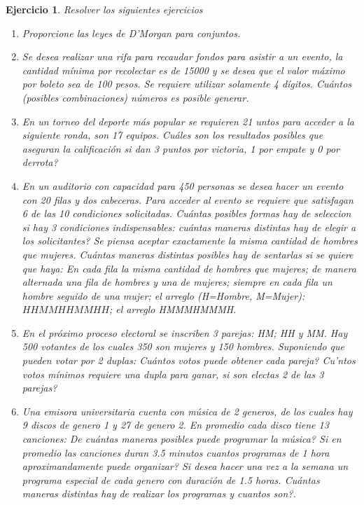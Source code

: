 \documentclass[12pt,twoside]{article}
\newtheorem{Ejer}{Ejercicio}
\begin{document}
\begin{Ejer} Resolver los siguientes ejercicios
\begin{enumerate}

\item Proporcione las leyes de D'Morgan para conjuntos.


\item Se desea realizar una rifa para recaudar fondos para asistir a un evento, la cantidad m\'inima por recolectar es de 15000 y se desea que el valor m\'aximo por boleto sea de 100 pesos. Se requiere utilizar solamente 4 d\'igitos. Cu\'antos (posibles combinaciones) n\'umeros es posible generar.


\item En un torneo del deporte m\'as popular se requieren 21 untos para acceder a la siguiente ronda, son 17 equipos.  Cu\'ales
son los resultados posibles que aseguran la calificaci\'on si dan 3 puntos por victoria, 1 por empate y 0 por derrota?


\item En un auditorio con capacidad para 450 personas se desea hacer un evento con 20 filas y dos cabeceras. Para acceder al evento se requiere que satisfagan 6 de las 10 condiciones solicitadas.  Cu\'antas posibles formas hay de seleccion si hay 3 condiciones indispensables: cu\'antas maneras distintas hay de elegir a los solicitantes? Se piensa aceptar exactamente la misma cantidad de hombres que mujeres. Cu\'antas maneras distintas posibles hay de sentarlas si se quiere que haya:  En cada fila la misma cantidad de hombres que mujeres; de manera alternada una fila de hombres y una de mujeres; siempre en cada fila un hombre seguido de una mujer; el arreglo (H=Hombre, M=Mujer): $HHMMHHMMHH$; el arreglo HMMMHMMMH.


\item En el pr\'oximo proceso electoral se inscriben 3 parejas: HM; HH y MM. Hay 500 votantes de los cuales 350 son mujeres y 150 hombres. Suponiendo que pueden votar por 2 duplas: Cu\'antos votos puede obtener cada pareja? Cu\a'ntos votos m\'inimos requiere una dupla para ganar, si son electas 2 de las 3 parejas?


\item Una emisora universitaria cuenta con m\'usica de 2 generos, de los cuales hay 9 discos de genero 1 y 27 de genero 2. En promedio cada disco tiene 13 canciones: De cu\'antas maneras posibles puede programar la m\'usica?   Si en promedio las canciones duran 3.5 minutos cuantos programas de 1 hora aproximandamente puede organizar?  Si desea hacer una vez a la semana un programa especial de cada genero con duraci\'on de 1.5 horas.  Cu\'antas maneras distintas hay de realizar los programas y cuantos son?.



\end{enumerate}
\end{Ejer}
\end{document}
